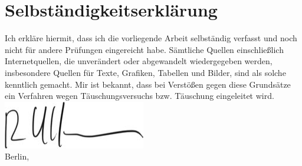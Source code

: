 \section*{Selbst\"andigkeitserkl\"arung}


Ich erkl\"are hiermit, dass ich die vorliegende Arbeit selbst\"andig verfasst und 
noch nicht f\"ur andere Pr\"ufungen eingereicht habe. S\"amtliche Quellen 
einschlie\ss lich Internetquellen, die unver\"andert oder abgewandelt wiedergegeben 
werden, insbesondere Quellen f\"ur Texte, Grafiken, Tabellen und Bilder, sind als 
solche kenntlich gemacht. Mir ist bekannt, dass bei Verst\"o\ss en gegen diese 
Grunds\"atze ein Verfahren wegen T\"auschungsversuchs bzw. T\"auschung eingeleitet 
wird.\\[3cm]
\includegraphics{unterschrift_richard}\\ 
Berlin, \dcdatesubmitted